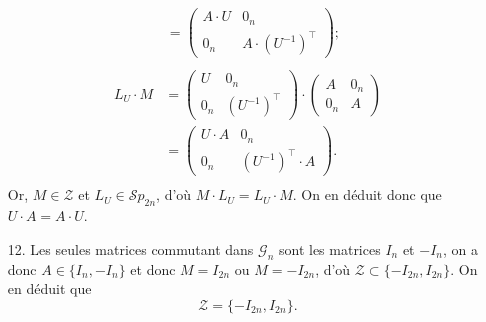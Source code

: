 \documentclass[a4paper]{article}
\begin{document}
\begin{enumerate}
\begin{align*}
				&= \begin{pmatrix}
					A\cdot U&0_n\\
					0_n&A\cdot (U^{-1})^\top
				\end{pmatrix} ; \\
			\end{align*}
			\begin{align*}
				L_U\cdot M &= \begin{pmatrix}
					U&0_n\\
					0_n&(U^{-1})^\top
				\end{pmatrix} \cdot \begin{pmatrix}
					A&0_n\\
					0_n&A
				\end{pmatrix} \\
				&= \begin{pmatrix}
					U\cdot A& 0_n\\
					0_n&(U^{-1})^\top \cdot A
				\end{pmatrix}. \\
			\end{align*}
			Or, $M \in \mathcal{Z}$\/ et $L_U \in \mathcal{S}p_{2n}$, d'où $M\cdot L_U = L_U\cdot M$. On en déduit donc que $U\cdot A = A \cdot U$.
		\item[12.] Les seules matrices commutant dans $\mathcal{G}_n$\/ sont les matrices $I_n$\/ et $-I_n$, on a donc $A \in \{I_n,-I_n\}$\/ et donc $M = I_{2n}$\/ ou $M = -I_{2n}$, d'où $\mathcal{Z} \subset \{-I_{2n}, I_{2n}\}$. On en déduit que \[
			\boxed{\mathcal{Z} = \{-I_{2n}, I_{2n}\}.}
		\]
	\end{enumerate}
\end{document}
